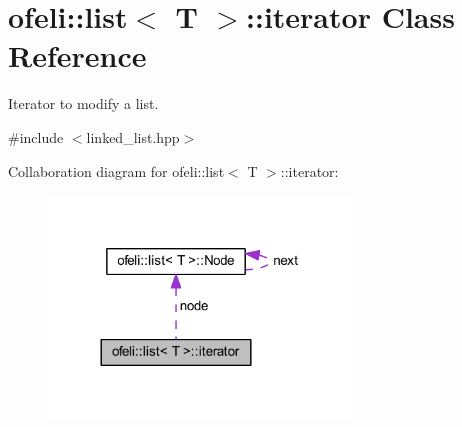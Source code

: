 \hypertarget{classofeli_1_1list_1_1iterator}{\section{ofeli\-:\-:list$<$ T $>$\-:\-:iterator Class Reference}
\label{classofeli_1_1list_1_1iterator}
}


Iterator to modify a list.  




{\ttfamily \#include $<$linked\-\_\-list.\-hpp$>$}



Collaboration diagram for ofeli\-:\-:list$<$ T $>$\-:\-:iterator\-:\nopagebreak
\begin{figure}[H]
\begin{center}
\leavevmode
\includegraphics[width=228pt]{classofeli_1_1list_1_1iterator__coll__graph}
\end{center}
\end{figure}
